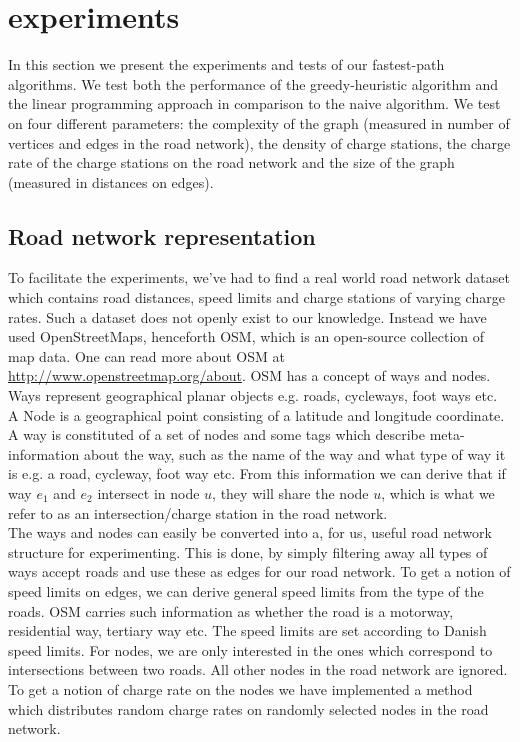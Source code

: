 \section{experiments}
\label{sec:experiments}
In this section we present the experiments and tests of our fastest-path algorithms. We test both the performance of the greedy-heuristic algorithm and the linear programming approach in comparison to the naive algorithm. We test on four different parameters: the complexity of the graph (measured in number of vertices and edges in the road network), the density of charge stations, the charge rate of the charge stations on the road network and the size of the graph (measured in distances on edges).

\subsection{Road network representation} 
\label{sub:setup}
To facilitate the experiments, we've had to find a real world road network dataset which contains road distances, speed limits and charge stations of varying charge rates. Such a dataset does not openly exist to our knowledge. Instead we have used OpenStreetMaps, henceforth OSM, which is an open-source collection of map data. One can read more about OSM at \url{http://www.openstreetmap.org/about}. OSM has a concept of ways and nodes. Ways represent geographical planar objects e.g. roads, cycleways, foot ways etc. A Node is a geographical point consisting of a latitude and longitude coordinate. A way is constituted of a set of nodes and some tags which describe meta-information about the way, such as the name of the way and what type of way it is e.g. a road, cycleway, foot way  etc. From this information we can derive that if way $e_1$ and $e_2$ intersect in node $u$, they will share the node $u$, which is what we refer to as an intersection/charge station in the road network.\\

The ways and nodes can easily be converted into a, for us, useful road network structure for experimenting. This is done, by simply filtering away all types of ways accept roads and use these as edges for our road network. To get a notion of speed limits on edges, we can derive general speed limits from the type of the roads. OSM carries such information as whether the road is a motorway, residential way, tertiary way etc. The speed limits are set according to Danish speed limits. For nodes, we are only interested in the ones which correspond to intersections between two roads. All other nodes in the road network are ignored. To get a notion of charge rate on the nodes we have implemented a method which distributes random charge rates on randomly selected nodes in the road network.
